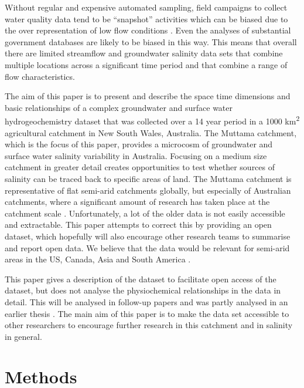 \documentclass[, manuscript]{copernicus}
\begin{document}
Without regular and expensive automated sampling, field campaigns to
collect water quality data tend to be ``snapshot'' activities
\citep{Grayson1997, Breuer2015, Lyon2008, Cartwright2010, Lintern2018}
which can be biased due to the over representation of low flow
conditions \citep{Lessels2020}. Even the analyses of substantial
government databases \citep{Lintern2018} are likely to be biased in this
way. This means that overall there are limited streamflow and
groundwater salinity data sets that combine multiple locations across a
significant time period and that combine a range of flow
characteristics.

The aim of this paper is to present and describe the space time
dimensions and basic relationships of a complex groundwater and surface
water hydrogeochemistry dataset that was collected over a 14 year period
in a 1000 km\textsuperscript{2} agricultural catchment in New South
Wales, Australia. The Muttama catchment, which is the focus of this
paper, provides a microcosm of groundwater and surface water salinity
variability in Australia. Focusing on a medium size catchment in greater
detail creates opportunities to test whether sources of salinity can be
traced back to specific areas of land. The Muttama catchment is
representative of flat semi-arid catchments globally, but especially of
Australian catchments, where a significant amount of research has taken
place at the catchment scale
\citep[e.g.][]{crosbie2007, Hughes2007, hughes2008, Summerell2006}.
Unfortunately, a lot of the older data is not easily accessible and
extractable. This paper attempts to correct this by providing an open
dataset, which hopefully will also encourage other research teams to
summarise and report open data. We believe that the data would be
relevant for semi-arid areas in the US, Canada, Asia and South America
\citep{thorslund_vanvliet2020, stavi2021}.

This paper gives a description of the dataset to facilitate open access
of the dataset, but does not analyse the physiochemical relationships in
the data in detail. This will be analysed in follow-up papers and was
partly analysed in an earlier thesis \citep{Akter2018}. The main aim of
this paper is to make the data set accessible to other researchers to
encourage further research in this catchment and in salinity in general.

\section{Methods}
\end{document}
